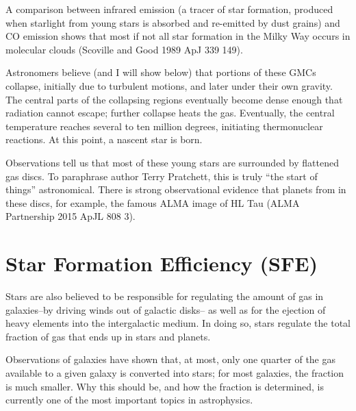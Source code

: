 \documentclass[../dissertation.tex]{subfiles}
\begin{document}
A comparison between infrared emission (a tracer of star formation, produced when starlight from young stars is absorbed and re-emitted by dust grains) and CO emission shows that most if not all star formation in the Milky Way occurs in molecular clouds (Scoville and Good 1989 ApJ 339 149).

Astronomers believe (and I will show below) that portions of these GMCs collapse, initially due to turbulent motions, and later under their own gravity. 
The central parts of the collapsing regions eventually become dense enough that radiation cannot escape; further collapse heats the gas. 
Eventually, the central temperature reaches several to ten million degrees, initiating  thermonuclear reactions. At this point, a nascent star is born.

Observations tell us that most of these young stars are surrounded by flattened gas discs. To paraphrase author Terry Pratchett, this is truly ``the start of things'' astronomical. 
There is strong observational evidence that planets from in these discs, for example, the famous ALMA image of HL Tau (ALMA Partnership 2015 ApJL 808 3).



\section{Star Formation Efficiency (SFE)}

 Stars are also believed to be responsible for regulating the amount of gas in galaxies--by driving winds out of galactic disks-- as well as for the ejection of heavy elements into the intergalactic
medium.  In doing so, stars regulate the total fraction of gas that ends up in stars and planets. 
 
Observations of galaxies have shown that, at most, only one quarter of the gas available to a given galaxy is converted into stars; for most galaxies, the fraction is much smaller. 
Why this should be, and how the fraction is determined, is currently one of the most important topics in astrophysics.
\end{document}
